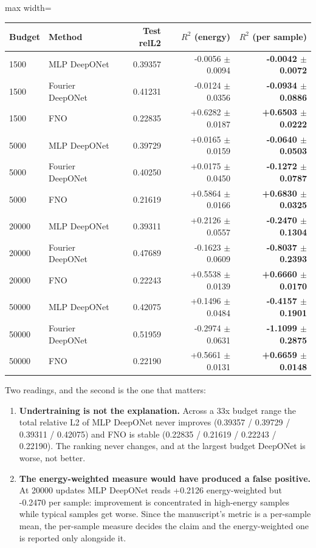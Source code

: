 \documentclass[preprint,12pt]{elsarticle}
\begin{document}
\begin{center}
\begin{adjustbox}{max width=\linewidth}
\small
\begin{tabular}{llrrr}
\toprule
Budget & Method & Test relL2 & $R^2$ (energy) & \textbf{$R^2$ (per sample)} \\
\midrule
1500 & MLP DeepONet & 0.39357 & -0.0056 $\pm$ 0.0094 & \textbf{-0.0042 $\pm$ 0.0072} \\
1500 & Fourier DeepONet & 0.41231 & -0.0124 $\pm$ 0.0356 & \textbf{-0.0934 $\pm$ 0.0886} \\
1500 & FNO & 0.22835 & +0.6282 $\pm$ 0.0187 & \textbf{+0.6503 $\pm$ 0.0222} \\
5000 & MLP DeepONet & 0.39729 & +0.0165 $\pm$ 0.0159 & \textbf{-0.0640 $\pm$ 0.0503} \\
5000 & Fourier DeepONet & 0.40250 & +0.0175 $\pm$ 0.0450 & \textbf{-0.1272 $\pm$ 0.0787} \\
5000 & FNO & 0.21619 & +0.5864 $\pm$ 0.0166 & \textbf{+0.6830 $\pm$ 0.0325} \\
20000 & MLP DeepONet & 0.39311 & +0.2126 $\pm$ 0.0557 & \textbf{-0.2470 $\pm$ 0.1304} \\
20000 & Fourier DeepONet & 0.47689 & -0.1623 $\pm$ 0.0609 & \textbf{-0.8037 $\pm$ 0.2393} \\
20000 & FNO & 0.22243 & +0.5538 $\pm$ 0.0139 & \textbf{+0.6660 $\pm$ 0.0170} \\
50000 & MLP DeepONet & 0.42075 & +0.1496 $\pm$ 0.0484 & \textbf{-0.4157 $\pm$ 0.1901} \\
50000 & Fourier DeepONet & 0.51959 & -0.2974 $\pm$ 0.0631 & \textbf{-1.1099 $\pm$ 0.2875} \\
50000 & FNO & 0.22190 & +0.5661 $\pm$ 0.0131 & \textbf{+0.6659 $\pm$ 0.0148} \\
\bottomrule
\end{tabular}
\end{adjustbox}
\end{center}


Two readings, and the second is the one that matters:

\begin{enumerate}
\item \textbf{Undertraining is not the explanation.} Across a 33x budget range the total relative L2 of MLP DeepONet never improves (0.39357 / 0.39729 / 0.39311 / 0.42075) and FNO is stable (0.22835 / 0.21619 / 0.22243 / 0.22190). The ranking never changes, and at the largest budget DeepONet is worse, not better.
\item \textbf{The energy-weighted measure would have produced a false positive.} At 20000 updates MLP DeepONet reads +0.2126 energy-weighted but -0.2470 per sample: improvement is concentrated in high-energy samples while typical samples get worse. Since the manuscript's metric is a per-sample mean, the per-sample measure decides the claim and the energy-weighted one is reported only alongside it.
\end{enumerate}
\end{document}

